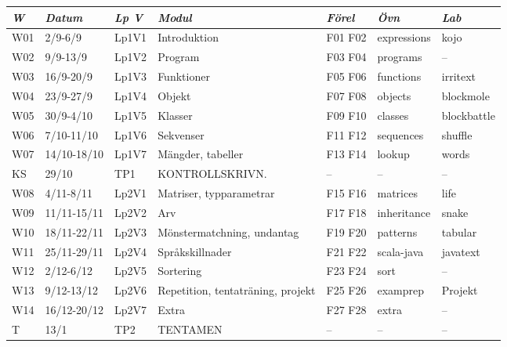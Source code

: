 \begin{tabular}{l|l|l|l|l|l|l}
\textit{W} & \textit{Datum} & \textit{Lp V} & \textit{Modul} & \textit{Förel} & \textit{Övn} & \textit{Lab} \\ \hline \hline
W01 & 2/9-6/9 & Lp1V1 & Introduktion & F01 F02 & expressions & kojo \\
W02 & 9/9-13/9 & Lp1V2 & Program & F03 F04 & programs & -- \\
W03 & 16/9-20/9 & Lp1V3 & Funktioner & F05 F06 & functions & irritext \\
W04 & 23/9-27/9 & Lp1V4 & Objekt & F07 F08 & objects & blockmole \\
W05 & 30/9-4/10 & Lp1V5 & Klasser & F09 F10 & classes & blockbattle \\
W06 & 7/10-11/10 & Lp1V6 & Sekvenser & F11 F12 & sequences & shuffle \\
W07 & 14/10-18/10 & Lp1V7 & Mängder, tabeller & F13 F14 & lookup & words \\
KS & 29/10 & TP1 & KONTROLLSKRIVN. & -- & -- & -- \\
W08 & 4/11-8/11 & Lp2V1 & Matriser, typparametrar & F15 F16 & matrices & life \\
W09 & 11/11-15/11 & Lp2V2 & Arv & F17 F18 & inheritance & snake \\
W10 & 18/11-22/11 & Lp2V3 & Mönstermatchning, undantag & F19 F20 & patterns & tabular \\
W11 & 25/11-29/11 & Lp2V4 & Språkskillnader & F21 F22 & scala-java & javatext \\
W12 & 2/12-6/12 & Lp2V5 & Sortering & F23 F24 & sort & -- \\
W13 & 9/12-13/12 & Lp2V6 & Repetition, tentaträning, projekt & F25 F26 & examprep & Projekt \\
W14 & 16/12-20/12 & Lp2V7 & Extra & F27 F28 & extra & -- \\
T & 13/1 & TP2 & TENTAMEN & -- & -- & -- \\
\end{tabular}
